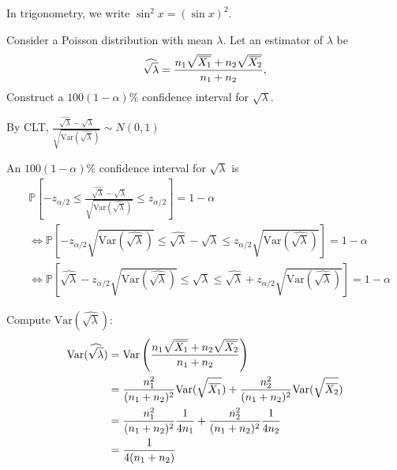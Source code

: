 \begin{remark}
    In trigonometry, we write $\sin^2 x = (\sin x)^2$.
\end{remark}

\begin{example}
    Consider a Poisson distribution with mean $\lambda$. Let an 
    estimator of $\lambda$ be 
    \[
        \widehat{\sqrt{\lambda}} = \frac{n_1 \sqrt{\ols{X_1}} + n_2 \sqrt{\ols{X_2}}}{n_1 + n_2},
    \]
    Construct a $100(1-\alpha)\%$ confidence interval for $\sqrt{\lambda}$.
\end{example}
\begin{solution}
    By CLT, $\displaystyle \frac{\widehat{\sqrt{\lambda}} - \sqrt{\lambda}}{\sqrt{\text{Var}(\widehat{\sqrt{\lambda}})}} \sim N(0,1)$

    An $100(1 - \alpha)\%$ confidence interval for $\sqrt{\lambda}$ is
    \begin{align*}
        &\mathbb{P} \left[ -z_{\alpha/2} \leq \frac{\widehat{\sqrt{\lambda}} - \sqrt{\lambda}}{\sqrt{\text{Var}(\widehat{\sqrt{\lambda}})}} \leq z_{\alpha/2} \right] = 1 - \alpha\\
        &\Longleftrightarrow \mathbb{P} \left[ -z_{\alpha/2} \sqrt{\text{Var}(\widehat{\sqrt{\lambda}})} \leq \widehat{\sqrt{\lambda}} - \sqrt{\lambda} \leq z_{\alpha/2} \sqrt{\text{Var}(\widehat{\sqrt{\lambda}})} \right] = 1 - \alpha\\
        &\Longleftrightarrow \mathbb{P} \left[ \widehat{\sqrt{\lambda}} - z_{\alpha/2} \sqrt{\text{Var}(\widehat{\sqrt{\lambda}})} \leq \sqrt   {\lambda} \leq \widehat{\sqrt{\lambda}} + z_{\alpha/2} \sqrt{\text{Var}(\widehat{\sqrt{\lambda}})} \right] = 1 - \alpha
    \end{align*}

    Compute $\text{Var}(\widehat{\sqrt{\lambda}})$:
    \begin{align*}
        \text{Var}(\widehat{\sqrt{\lambda}}) &= \text{Var}\left( \frac{n_1 \sqrt{\ols{X_1}} + n_2 \sqrt{\ols{X_2}}}{n_1 + n_2} \right)\\
        &= \frac{n_1^2}{(n_1 + n_2)^2} \text{Var}(\sqrt{\ols{X_1}}) + \frac{n_2^2}{(n_1 + n_2)^2} \text{Var}(\sqrt{\ols{X_2}})\\
        &= \frac{n_1^2}{(n_1 + n_2)^2} \frac{1}{4 n_1} + \frac{n_2^2}{(n_1 + n_2)^2} \frac{1}{4 n_2}\\
        &= \frac{1}{4 (n_1 + n_2)}
    \end{align*}
\end{solution}